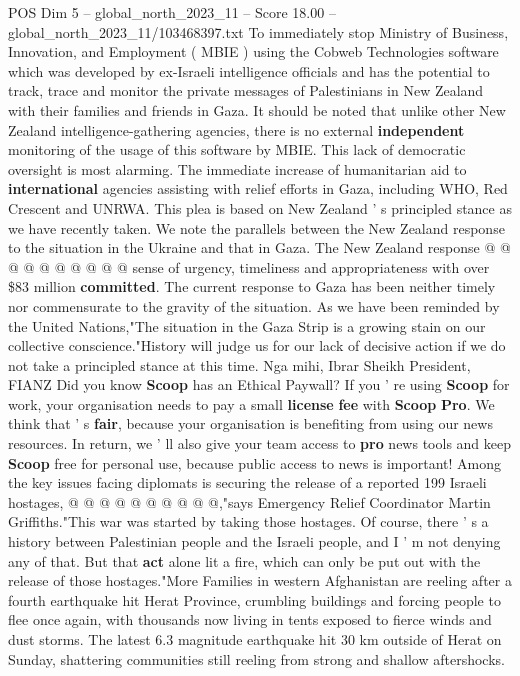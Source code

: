 \begin{textsample}{POS Dim 5 – global\_north\_2023\_11 – Score 18.00 – global\_north\_2023\_11/103468397.txt}
To immediately stop Ministry of Business, Innovation, and Employment ( MBIE ) using the Cobweb Technologies software which was developed by ex-Israeli intelligence officials and has the potential to track, trace and monitor the private messages of Palestinians in New Zealand with their families and friends in Gaza.
It should be noted that unlike other New Zealand intelligence-gathering agencies, there is no external \textbf{independent} monitoring of the usage of this software by MBIE.
This lack of democratic oversight is most alarming.
The immediate increase of humanitarian aid to \textbf{international} agencies assisting with relief efforts in Gaza, including WHO, Red Crescent and UNRWA.
This plea is based on New Zealand ' s principled stance as we have recently taken.
We note the parallels between the New Zealand response to the situation in the Ukraine and that in Gaza.
The New Zealand response @ @ @ @ @ @ @ @ @ @ sense of urgency, timeliness and appropriateness with over \$83 million \textbf{committed}.
The current response to Gaza has been neither timely nor commensurate to the gravity of the situation.
As we have been reminded by the United Nations,"The situation in the Gaza Strip is a growing stain on our collective conscience."History will judge us for our lack of decisive action if we do not take a principled stance at this time.
Nga mihi, Ibrar Sheikh President, FIANZ Did you know \textbf{Scoop} has an Ethical Paywall?
If you ' re using \textbf{Scoop} for work, your organisation needs to pay a small \textbf{license} \textbf{fee} with \textbf{Scoop} \textbf{Pro}.
We think that ' s \textbf{fair}, because your organisation is benefiting from using our news resources.
In return, we ' ll also give your team access to \textbf{pro} news tools and keep \textbf{Scoop} free for personal use, because public access to news is important!
Among the key issues facing diplomats is securing the release of a reported 199 Israeli hostages, @ @ @ @ @ @ @ @ @ @,"says Emergency Relief Coordinator Martin Griffiths."This war was started by taking those hostages.
Of course, there ' s a history between Palestinian people and the Israeli people, and I ' m not denying any of that.
But that \textbf{act} alone lit a fire, which can only be put out with the release of those hostages."More Families in western Afghanistan are reeling after a fourth earthquake hit Herat Province, crumbling buildings and forcing people to flee once again, with thousands now living in tents exposed to fierce winds and dust storms.
The latest 6.3 magnitude earthquake hit 30 km outside of Herat on Sunday, shattering communities still reeling from strong and shallow aftershocks.

\end{textsample}
